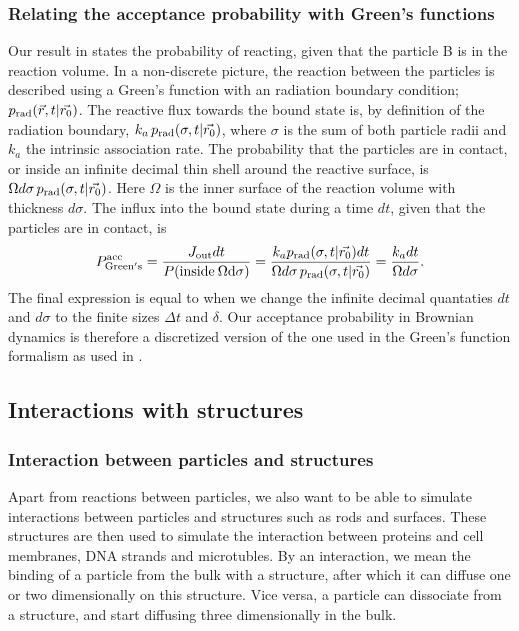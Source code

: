 \subsubsection{Relating the acceptance probability with Green's functions}
Our result in  states the probability of reacting, given that the particle B is in the reaction volume. In a non-discrete picture, the reaction between the particles is described using a Green's function with an radiation boundary condition; $p_{\rm rad}(\vec{r},t|\vec{r_0})$. The reactive flux towards the bound state is, by definition of the radiation boundary, $k_a \, p_{\rm rad}(\sigma,t|\vec{r_0})$, where $\sigma$ is the sum of both particle radii and $k_a$ the intrinsic association rate. The probability that the particles are in contact, or inside an infinite decimal thin shell around the reactive surface, is $\Omega d\sigma \, p_{\rm rad}(\sigma,t|\vec{r_0})$. Here $\Omega$ is the inner surface of the reaction volume with thickness $d\sigma$. The influx into the bound state during a time $dt$, given that the particles are in contact, is \cite{Becker2011}
\begin{equation}
 P^{\rm acc}_{\rm Green's} = \frac{J_{\rm out}dt}{P({\rm inside\:\Omega d\sigma})} = \frac{k_a p_{\rm rad}(\sigma,t|\vec{r_0})dt}{\Omega d\sigma \, p_{\rm rad}(\sigma,t|\vec{r_0})} = \frac{k_a dt}{\Omega d\sigma}.
 \elabel{GFvsBD}
\end{equation}
The final expression is equal to  when we change the infinite decimal quantaties $dt$ and $d\sigma$ to the finite sizes $\Delta t$ and $\delta$. Our acceptance probability in Brownian dynamics is therefore a discretized version of the one used in the Green's function formalism as used in \GFRD. 

\subsection{Interactions with structures}

\subsubsection{Interaction between particles and structures}
Apart from reactions between particles, we also want to be able to simulate interactions between particles and structures such as rods and surfaces. These structures are then used to simulate the interaction between proteins and cell membranes, DNA strands and microtubles. By an interaction, we mean the binding of a particle from the bulk with a structure, after which it can diffuse one or two dimensionally on this structure. Vice versa, a particle can dissociate from a structure, and start diffusing three dimensionally in the bulk.

